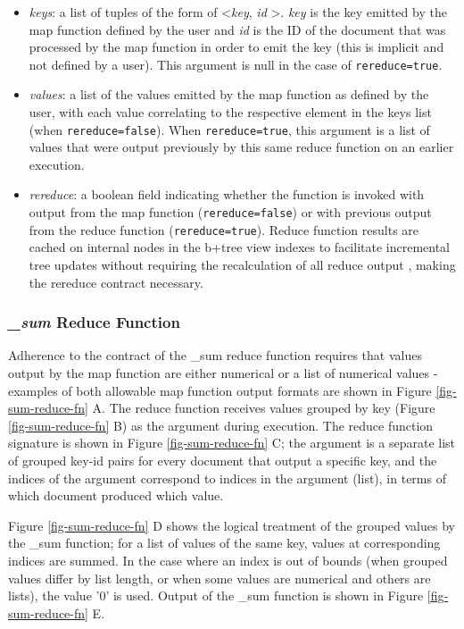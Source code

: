 \begin{itemize}
    \item \textit{keys}: a list of tuples of the form of \textless \textit{key}, \textit{id} \textgreater. \textit{key} is the key emitted by the map function defined by the user and \textit{id} is the ID of the document that was processed by the map function in order to emit the key (this is implicit and not defined by a user). This argument is null in the case of \texttt{rereduce=true}.
    \item \textit{values}: a list of the values emitted by the map function as defined by the user, with each value correlating to the respective element in the keys list (when \texttt{rereduce=false}). When \texttt{rereduce=true}, this argument is a list of values that were output previously by this same reduce function on an earlier execution.
    \item \textit{rereduce}: a boolean field indicating whether the function is invoked with output from the map function (\texttt{rereduce=false}) or with previous output from the reduce function (\texttt{rereduce=true}). Reduce function results are cached on internal nodes in the b+tree view indexes to facilitate incremental tree updates without requiring the recalculation of all reduce output \cite{slack25Oct}, making the rereduce contract necessary.
\end{itemize}

\subsubsection{\textit{\_sum} Reduce Function}
Adherence to the contract of the \_sum reduce function requires that values output by the map function are either numerical or a list of numerical values - examples of both allowable map function output formats are shown in Figure \ref{fig-sum-reduce-fn} A. The reduce function receives values grouped by key (Figure \ref{fig-sum-reduce-fn} B) as the  argument during execution. The reduce function signature is shown in Figure \ref{fig-sum-reduce-fn} C; the  argument is a separate list of grouped key-id pairs for every document that output a specific key, and the indices of the  argument correspond to indices in the  argument (list), in terms of which document produced which value.

Figure \ref{fig-sum-reduce-fn} D shows the logical treatment of the grouped values by the \_sum function; for a list of values of the same key, values at corresponding indices are summed. In the case where an index is out of bounds (when grouped values differ by list length, or when some values are numerical and others are lists), the value '0' is used. Output of the \_sum function is shown in Figure \ref{fig-sum-reduce-fn} E.

